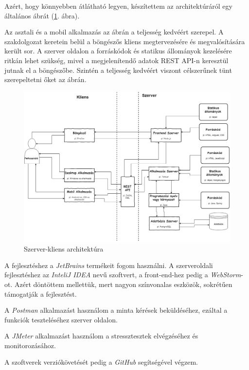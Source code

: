 
Azért, hogy könnyebben átlátható legyen, készítettem az architektúráról egy általános ábrát (\ref{fig:architecture}. ábra).

Az asztali és a mobil alkalmazás az ábrán a teljesség kedvéért szerepel. A szakdolgozat keretein belül a böngészős kliens megtervezésére és megvalósítására került sor. A szerver oldalon a forráskódok és statikus állományok kezelésére ritkán lehet szükség, mivel a megjelenítendő adatok REST API-n keresztül jutnak el a böngészőbe. Szintén a teljesség kedvéért viszont célszerűnek tünt szerepeltetni őket az ábrán.

\begin{figure}[h!]
\centering
\includegraphics[scale=0.365]{kepek/architecture.jpg}
\caption{Szerver-kliens architektúra}
\label{fig:architecture}
\end{figure}


A fejlesztéshez a \textit{JetBrains} termékeit fogom használni. A szerveroldali fejlesztéshez az \textit{InteliJ IDEA} nevű szoftvert, a front-end-hez pedig a \textit{WebStorm}-ot. Azért döntöttem mellettük, mert nagyon színvonalas eszközök, sokrétűen támogatják a fejlesztést.
 
A \textit{Postman} alkalmazást használom a minta kérések beküldéséhez, ezáltal a funkciók teszteléséhez szerver oldalon.

A \textit{JMeter} alkalmazást használom a stressztesztek elvégzéséhez és monitorozásához.

A szoftverek verziókövetését pedig a \textit{GitHub} segítségével végzem.


